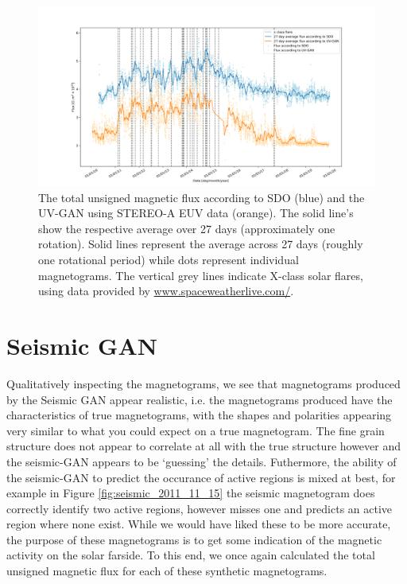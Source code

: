 \documentclass[11pt,a4paper,onecolumn]{report}
\begin{document}
\begin{figure}[t]
  \centering
  \includegraphics[width=\linewidth]{Flux_SDO_UV-GAN_average.png}

  \caption{The total unsigned magnetic flux according
  to SDO (blue) and the UV-GAN using STEREO-A EUV data (orange). The solid line's show the respective
  average over 27 days (approximately one rotation). Solid lines represent the average across 27
  days (roughly one rotational period) while dots represent individual
  magnetograms. The vertical grey lines indicate X-class solar flares, using
  data provided by \url{www.spaceweatherlive.com/}.}
  \label{fig:flux_sdo_uv}
\end{figure}

\section{Seismic GAN}
Qualitatively inspecting the magnetograms, we see that magnetograms produced by
the Seismic GAN appear realistic, i.e. the magnetograms produced have the
characteristics of true magnetograms, with the shapes and polarities appearing
very similar to what you could expect on a true magnetogram. The fine grain
structure does not appear to correlate at all with the true structure however
and the seismic-GAN appears to be `guessing' the details. Futhermore, the
ability of the seismic-GAN to predict the occurance of active regions is mixed
at best, for example in Figure \ref{fig:seismic_2011_11_15} the seismic
magnetogram does correctly identify two active regions, however misses one and
predicts an active region where none exist. While we would have liked these to
be more accurate, the purpose of these magnetograms is to get some indication of
the magnetic activity on the solar farside. To this end, we once again
calculated the total unsigned magnetic flux for each of these synthetic
magnetograms.\\
\end{document}
